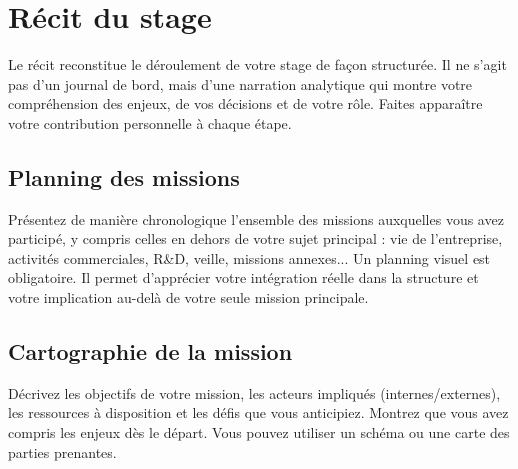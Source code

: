 \section{Récit du stage}

\begin{guideline}
Le récit reconstitue le déroulement de votre stage de façon structurée. Il ne s'agit pas d'un journal de bord, mais d'une narration analytique qui montre votre compréhension des enjeux, de vos décisions et de votre rôle. Faites apparaître votre contribution personnelle à chaque étape.
\end{guideline}

\subsection{Planning des missions}

\begin{guideline}
Présentez de manière chronologique l'ensemble des missions auxquelles
vous avez participé, y compris celles en dehors de votre sujet principal :
vie de l'entreprise, activités commerciales, R\&D, veille, missions
annexes... Un planning visuel est obligatoire. Il permet d'apprécier
votre intégration réelle dans la structure et votre implication au-delà
de votre seule mission principale.
\end{guideline}


\subsection{Cartographie de la mission}

\begin{guideline}
Décrivez les objectifs de votre mission, les acteurs impliqués (internes/externes), les ressources à disposition et les défis que vous anticipiez. Montrez que vous avez compris les enjeux dès le départ. Vous pouvez utiliser un schéma ou une carte des parties prenantes.
\end{guideline}




